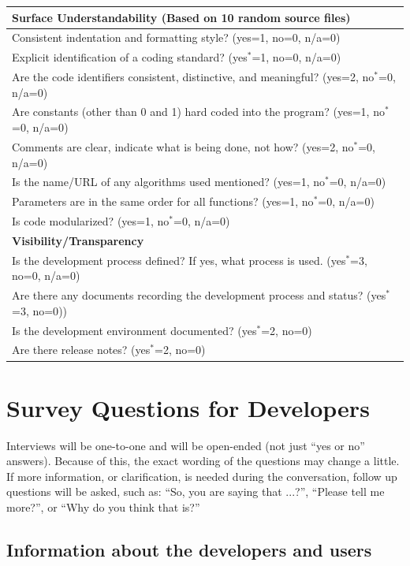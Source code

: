 \documentclass[letterpaper,cleveref]{lipics-v2019}
\begin{document}
\def\arraystretch{1.4}
\begin{tabular}{p{14cm}}
\hline	
\textbf{Surface Understandability (Based on 10 random source files)}\\
\hline
Consistent indentation and formatting style? ({yes=1, no=0, n/a=0})\\
Explicit identification of a coding standard? ({yes$^*$=1, no=0, n/a=0})\\
Are the code identifiers consistent, distinctive, and meaningful? ({yes=2,
no$^*$=0, n/a=0})\\
Are constants (other than 0 and 1) hard coded into the program? ({yes=1, no$^*$=0,
n/a=0})\\
Comments are clear, indicate what is being done, not how? ({yes=2, no$^*$=0,
n/a=0})\\
Is the name/URL of any algorithms used mentioned? ({yes=1, no$^*$=0, n/a=0})\\
Parameters are in the same order for all functions? ({yes=1, no$^*$=0, n/a=0})\\
Is code modularized? ({yes=1, no$^*$=0, n/a=0})\\
\hline		
\textbf{Visibility/Transparency}\\
\hline
Is the development process defined? If yes, what process is used. ({yes$^*$=3,
no=0, n/a=0})\\
Are there any documents recording the development process and status?  ({yes$^*$=3,
no=0}))\\
Is the development environment documented? ({yes$^*$=2, no=0})\\
Are there release notes? ({yes$^*$=2, no=0})\\
\hline
\end{tabular}

\newpage

\section{Survey Questions for Developers} \label{SecSurveyQuestions}

Interviews will be one-to-one and will be open-ended (not just “yes or no”
answers). Because of this, the exact wording of the questions may change a
little. If more information, or clarification, is needed during the
conversation, follow up questions will be asked, such as: ``So, you are saying
that ...?'', ``Please tell me more?'', or ``Why do you think that is?''

\subsection{Information about the developers and users} 
\end{document}

